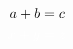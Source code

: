 \documentclass[12pt,border=2pt,preview]{standalone}
\begin{document}
\begin{align*}
\color{black}a+b &\color{black}= c \\
\color{white}x+y &\color{white}= z
\end{align*}
\end{document}
